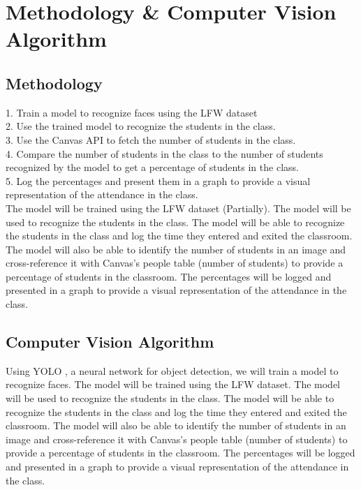 \section{Methodology \& Computer Vision Algorithm}
\label{sec:method}
\subsection{Methodology}
\label{subsec:method}
1. Train a model to recognize faces using the LFW dataset\\
2. Use the trained model to recognize the students in the class.\\
3. Use the Canvas API to fetch the number of students in the class.\\
4. Compare the number of students in the class to the number of students recognized by the model to get a percentage of students in the class.\\
5. Log the percentages and present them in a graph to provide a visual representation of the attendance in the class.\\

The model will be trained using the LFW dataset (Partially). The model will be used to recognize the students in the class. The model will be able to recognize the students in the class and log the time they entered and exited the classroom. The model will also be able to identify the number of students in an image and cross-reference it with Canvas's people table (number of students) to provide a percentage of students in the classroom. The percentages will be logged and presented in a graph to provide a visual representation of the attendance in the class.\\ 
\subsection{Computer Vision Algorithm}
\label{subsec:Computer Vision Algorithm}
Using YOLO \cite{YOLO}, a neural network for object detection, we will train a model to recognize faces. The model will be trained using the LFW dataset. The model will be used to recognize the students in the class. The model will be able to recognize the students in the class and log the time they entered and exited the classroom. The model will also be able to identify the number of students in an image and cross-reference it with Canvas's people table (number of students) to provide a percentage of students in the classroom. The percentages will be logged and presented in a graph to provide a visual representation of the attendance in the class.\\
